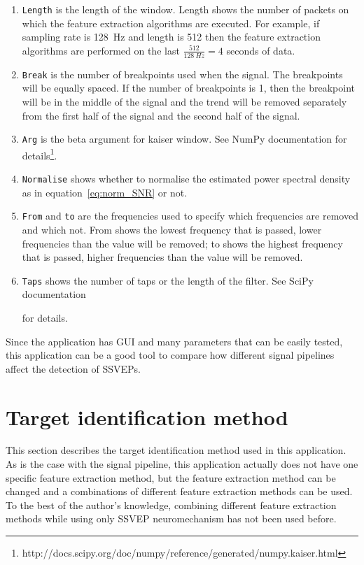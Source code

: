 \begin{enumerate}
	\item \texttt{Length} is the length of the window. Length shows the number of packets on which the \gls{feature extraction} algorithms are executed. For example, if \gls{sampling rate} is \SI{128}{Hz} and length is 512 then the \gls{feature extraction} algorithms are performed on the last $\frac{512}{\SI{128}{Hz}}=4$ seconds of data.
	\item \texttt{Break} is the number of breakpoints used when  the signal. The breakpoints will be equally spaced. If the number of breakpoints is 1, then the breakpoint will be in the middle of the signal and the trend will be removed separately from the first half of the signal and the second half of the signal.
	\item \texttt{Arg} is the beta argument for kaiser window. See NumPy documentation for details\footnote{http://docs.scipy.org/doc/numpy/reference/generated/numpy.kaiser.html}.
	\item \texttt{Normalise} shows whether to normalise the estimated \gls{power spectral density} as in equation~\ref{eq:norm_SNR} or not.
	\item \texttt{From} and \texttt{to} are the frequencies used to specify which frequencies are removed and which not. From shows the lowest frequency that is passed, lower frequencies than the value will be removed; to shows the highest frequency that is passed, higher frequencies than the value will be removed.
	\item \texttt{Taps} shows the number of taps or the length of the filter. See SciPy documentation\addtocounter{footnote}{-2}\footnotemark\addtocounter{footnote}{1} for details.
\end{enumerate}

Since the application has \gls{GUI} and many parameters that can be easily tested, this application can be a good tool to compare how different signal pipelines affect the detection of \glspl{SSVEP}.

\section{Target identification method}
\label{sec:identification}

This section describes the \gls{target} identification method used in this application. As is the case with the signal pipeline, this application actually does not have one specific \gls{feature extraction} method, but the \gls{feature extraction} method can be changed and a combinations of different \gls{feature extraction} methods can be used. To the best of the author's knowledge, combining different \gls{feature extraction} methods while using only \gls{SSVEP} neuromechanism has not been used before.

